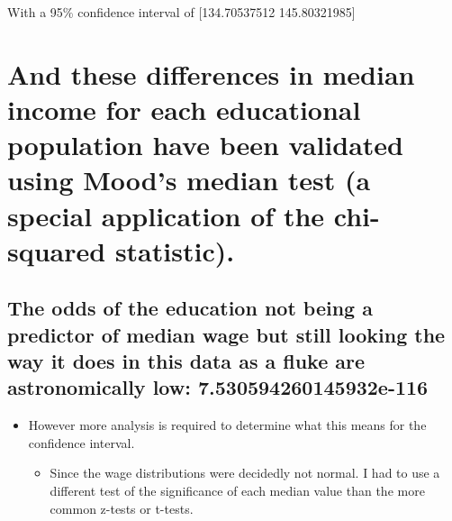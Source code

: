 \documentclass[11pt]{article}
\providecommand{\tightlist}{%
      \setlength{\itemsep}{0pt}\setlength{\parskip}{0pt}}
\begin{document}
With a 95\% confidence interval of {[}134.70537512 145.80321985{]}

    \section{And these differences in median income for each educational
population have been validated using Mood's median test (a special
application of the chi-squared
statistic).}\label{and-these-differences-in-median-income-for-each-educational-population-have-been-validated-using-moods-median-test-a-special-application-of-the-chi-squared-statistic.}

\subsection{The odds of the education not being a predictor of median
wage but still looking the way it does in this data as a fluke are
astronomically low:
7.530594260145932e-116}\label{the-odds-of-the-education-not-being-a-predictor-of-median-wage-but-still-looking-the-way-it-does-in-this-data-as-a-fluke-are-astronomically-low-7.530594260145932e-116}

\begin{itemize}
\tightlist
\item
  However more analysis is required to determine what this means for the
  confidence interval.

  \begin{itemize}
  \tightlist
  \item
    Since the wage distributions were decidedly not normal. I had to use
    a different test of the significance of each median value than the
    more common z-tests or t-tests.
  \end{itemize}
\end{itemize}
\end{document}
